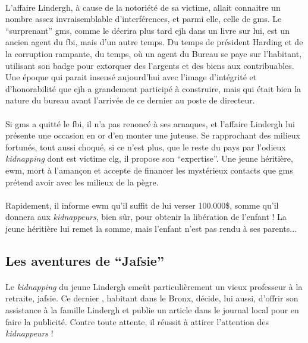 \paragraph{} L'affaire Lindergh, à cause de la notoriété de sa victime, allait connaitre un nombre assez invraisemblable d'interférences, 
et parmi elle, celle de \gls{gms}. Le ``surprenant'' \gls{gms}, comme le décrira plus tard \gls{ejh} dans un livre sur lui, est un ancien
agent du \gls{fbi}, mais d'un autre temps. Du temps de président Harding et de la corruption rampante, du temps, où un agent du Bureau se
paye sur l'habitant, utilisant son badge pour extorquer des l'argents et des biens aux contribuables. Une époque qui parait insensé 
aujourd'hui avec l'image d'intégrité et d'honorabilité que \gls{ejh} a grandement participé à construire, mais qui était bien la nature
du bureau avant l'arrivée de ce dernier au poste de directeur.
\paragraph{} Si \gls{gms} a quitté le \gls{fbi}, il n'a pas renoncé à ses arnaques, et l'affaire Lindergh lui présente une occasion en
or d'en monter une juteuse. Se rapprochant des milieux fortunés, tout aussi choqué, si ce n'est plus, que le reste du pays par l'odieux
\emph{kidnapping} dont est victime \gls{clg}, il propose son ``expertise''. Une jeune héritière, \gls{ewm}, mort à l'amançon et accepte 
de financer les mystérieux contacts que \gls{gms} prétend avoir avec les milieux de la pègre. 
\paragraph{} Rapidement, il informe \gls{ewm} qu'il suffit de lui verser 100.000\$, somme qu'il donnera aux \emph{kidnappeurs}, bien 
sûr, pour obtenir la libération de l'enfant ! La jeune héritière lui remet la somme, mais l'enfant n'est pas rendu à ses parents...
\subsection{Les aventures de ``Jafsie''}
\paragraph{} Le \emph{kidnapping} du jeune Lindergh emeût particulièrement un vieux professeur à la retraite, \gls{jafsie}. Ce dernier 
, habitant dans le Bronx, décide, lui aussi, d'offrir son assistance à la famille Lindergh et publie un article dans le journal local
pour en faire la publicité. Contre toute attente, il réussit à attirer l'attention des \emph{kidnappeurs} !
